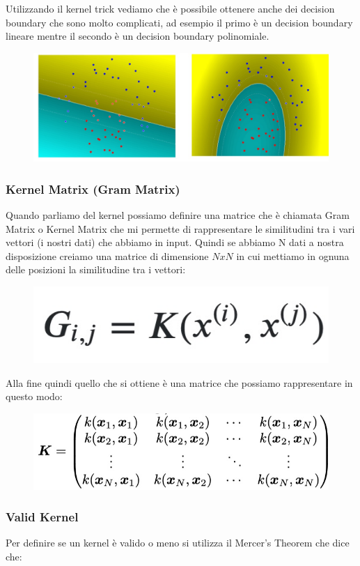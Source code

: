 \documentclass[14pt]{extreport}
\begin{document}
Utilizzando il kernel trick vediamo che è possibile ottenere anche dei decision boundary che sono molto complicati, ad esempio il primo è un decision
boundary lineare mentre il secondo è un decision boundary polinomiale.
\begin{figure}[H]
	\centering
	\includegraphics[width=0.5\linewidth]{339.jpeg}
\end{figure}

\subsubsection{Kernel Matrix (Gram Matrix)}

Quando parliamo del kernel possiamo definire una matrice che è chiamata Gram Matrix o Kernel Matrix che mi permette di rappresentare le similitudini
tra i vari vettori (i nostri dati) che abbiamo in input. Quindi se abbiamo N dati a nostra disposizione creiamo una matrice di dimensione $NxN$ in cui
mettiamo in ognuna delle posizioni la similitudine tra i vettori:
\begin{figure}[H]
	\centering
	\includegraphics[width=0.2\linewidth]{340.jpeg}
\end{figure}

Alla fine quindi quello che si ottiene è una matrice che possiamo rappresentare in questo modo:

\begin{figure}[H]
	\centering
	\includegraphics[width=0.5\linewidth]{341.jpeg}
\end{figure}


\subsubsection{Valid Kernel}

Per definire se un kernel è valido o meno si utilizza il Mercer's Theorem che dice che:
\end{document}
